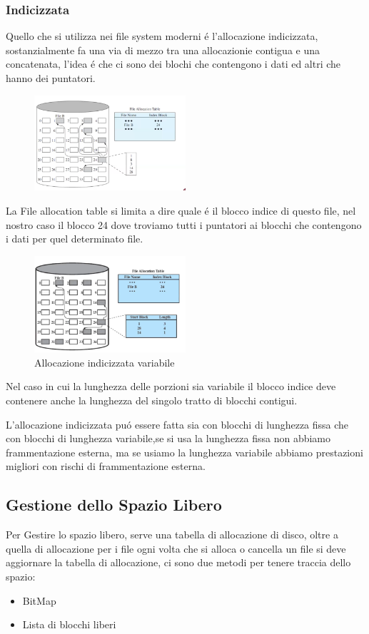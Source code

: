 \subsubsection*{Indicizzata}
Quello che si utilizza nei file system moderni é l'allocazione indicizzata,
sostanzialmente fa una via di mezzo tra una allocazionie contigua e una concatenata, l'idea é
che ci sono dei blochi che contengono i dati ed altri che hanno dei puntatori.
\begin{figure}[H]
    \centering
    \includegraphics[width=0.5\textwidth]{immagini/AllocazioneIndicizzata}
\end{figure}
La File allocation table si limita a dire quale é il blocco indice di questo file, nel nostro caso il blocco 24 dove troviamo
tutti i puntatori ai blocchi che contengono i dati per quel determinato file.
\begin{figure}[H]
    \centering
    \includegraphics[width=0.5\textwidth]{immagini/AllocazioneIndicizzataVariabile}
    \caption{Allocazione indicizzata variabile}
\end{figure}
Nel caso in cui la lunghezza delle porzioni sia variabile il blocco indice deve contenere anche la lunghezza del
singolo tratto di blocchi contigui.

L'allocazione indicizzata puó essere fatta sia con blocchi di lunghezza fissa che con blocchi di lunghezza variabile,se si usa
la lunghezza fissa non abbiamo frammentazione esterna, ma se usiamo la lunghezza variabile abbiamo prestazioni migliori con rischi di
frammentazione esterna.
\subsection{Gestione dello Spazio Libero}
Per Gestire lo spazio libero, serve una tabella di allocazione di disco, oltre a quella di allocazione per i file ogni volta
che si alloca o cancella un file si deve aggiornare la tabella di allocazione, ci sono due metodi per tenere traccia dello spazio:
\begin{itemize}
    \item BitMap
    \item Lista di blocchi liberi
\end{itemize}
